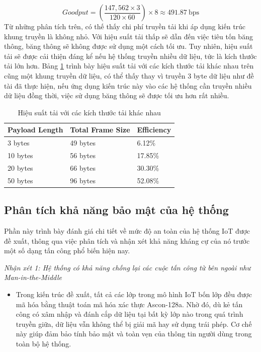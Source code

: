 \[
\textit{Goodput} = \left( \frac{147,562 \times 3}{120 \times 60} \right) \times 8 \approx 491.87 \ \text{bps}
\]
Từ những phân tích trên, có thế thấy chi phí truyền tải khi áp dụng kiến trúc khung truyền là không nhỏ. Với hiệu suất tải thấp sẽ dẫn đến việc tiêu tốn băng thông, băng thông sẽ không được sử dụng một cách tối ưu. Tuy nhiên, hiệu suất tải sẽ được cải thiện đáng kể nếu hệ thống truyền nhiều dữ liệu, tức là kích thước tải lớn hơn. Bảng \ref{tab:efficiency} trình bày hiệu suất tải với các kích thước tải khác nhau trên cũng một khung truyền dữ liệu, có thể thấy thay vì truyền 3 byte dữ liệu như đề tài đã thực hiện, nếu ứng dụng kiến trúc này vào các hệ thống cần truyền nhiều dữ liệu đồng thời, việc sử dụng băng thông sẽ được tối ưu hơn rất nhiều.
\begin{table}[h]
\centering
\small
\caption{Hiệu suất tải với các kích thước tải khác nhau}
\label{tab:efficiency}
\begin{tabular}{|p{4cm}|p{5cm}|p{3cm}|}
\hline
Payload Length & Total Frame Size & Efficiency \\
\hline
3 bytes   & 49 bytes  & 6.12\%  \\
10 bytes  & 56 bytes & 17.85\% \\
20 bytes  & 66 bytes & 30.30\% \\
50 bytes  & 96 bytes & 52.08\% \\
\hline
\end{tabular}
\end{table}
\subsection{Phân tích khả năng bảo mật của hệ thống}
Phần này trình bày đánh giá chi tiết về mức độ an toàn của hệ thống IoT được đề xuất, thông qua việc phân tích và nhận xét khả năng kháng cự của nó trước một số dạng tấn công phổ biến hiện nay.

\textit{Nhận xét 1: Hệ thống có khả năng chống lại các cuộc tấn công từ bên ngoài như Man-in-the-Middle}
\begin{itemize}
    \item Trong kiến trúc đề xuất, tất cả các lớp trong mô hình IoT bốn lớp đều được mã hóa bằng thuật toán mã hóa xác thực Ascon-128a. Nhờ đó, dù kẻ tấn công có xâm nhập và đánh cắp dữ liệu tại bất kỳ lớp nào trong quá trình truyền giữa, dữ liệu vẫn không thể bị giải mã hay sử dụng trái phép. Cơ chế này giúp đảm bảo tính bảo mật và toàn vẹn của thông tin người dùng trong toàn bộ hệ thống.
\end{itemize}

